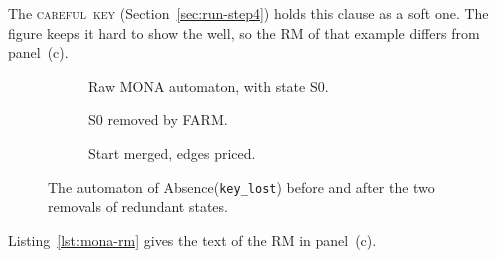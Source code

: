 \documentclass[11pt,english,listoffigures,listoftables]{tfgetsinf}
\newcommand{\runex}[1]{\textsc{#1}}  %
\begin{document}
The \mbox{\runex{careful key}} (Section~\ref{sec:run-step4}) holds this clause as a soft one. The figure keeps it hard to show the well, so the RM of that example differs from panel~(c).

\begin{figure}[H]
    \centering
    \captionsetup[subfigure]{justification=centering}%
    \begin{subfigure}[b]{0.48\textwidth}
        \centering
        \scalebox{0.88}{\begin{tikzpicture}[mona panel, x=0.85cm]
            
        \end{tikzpicture}}
        \caption{Raw MONA automaton, with state S0.}
        \label{fig:mona-pre}
    \end{subfigure}\hfill
    \begin{subfigure}[b]{0.34\textwidth}
        \centering
        \scalebox{0.88}{\begin{tikzpicture}[mona panel, x=0.85cm]
            
        \end{tikzpicture}}
        \caption{S0 removed by FARM.}
        \label{fig:mona-post1}
    \end{subfigure}\hfill
    \begin{subfigure}[b]{0.17\textwidth}
        \centering
        \begin{tikzpicture}[mona panel, x={(0cm,-0.75cm)}]
            
        \end{tikzpicture}
        \caption{Start merged, edges priced.}
        \label{fig:mona-post2}
    \end{subfigure}
    \caption[Redundant states removed from Absence(\texttt{key\_lost})]{The automaton of Absence(\texttt{key\_lost}) before and after the two removals of redundant states.}
    \label{fig:mona-stages}
\end{figure}

Listing~\ref{lst:mona-rm} gives the text of the RM in panel~(c).

\noindent\begin{minipage}{\linewidth}

\end{minipage}
\end{document}
